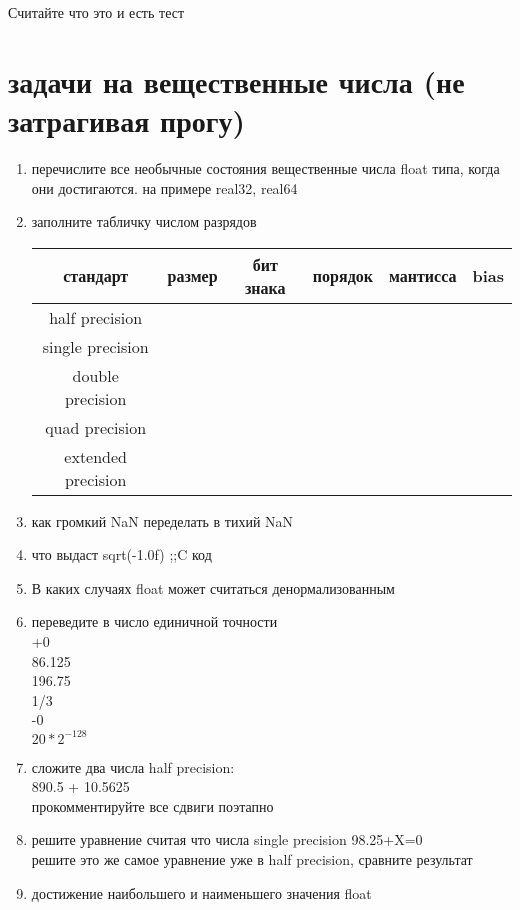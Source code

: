 \documentclass[a4paper,10pt]{article}
\begin{document}
Считайте что это и есть тест

\section*{задачи на вещественные числа (не затрагивая прогу)}
\begin{enumerate}
    \item перечислите все необычные состояния вещественные числа float типа, когда они достигаются. на примере real32, real64
    \item заполните табличку числом разрядов \\
    \begin{tabular}{|c|c|c|c|c|c|}
        \hline
        стандарт& размер & бит знака & порядок & мантисса & bias \\
        \hline
        half precision & & & & \\
        \hline
        single precision & & & & \\
        \hline
        double precision & & & & \\
        \hline
        quad precision & & & & \\
        \hline
        extended precision & & & & \\
        \hline
    \end{tabular}
    \item как громкий NaN переделать в тихий NaN
    \item что выдаст sqrt(-1.0f) ;;C код
    \item В каких случаях float может считаться денормализованным
    \item переведите в число единичной точности\\
    +0 \\ 
    86.125 \\
    196.75 \\
    1/3 \\
    -0 \\
    $20*2^{-128}$ \\
    \item сложите два числа half precision: \\
    890.5 + 10.5625\\
    прокомментируйте все сдвиги поэтапно \\
    \item решите уравнение считая что числа single precision
    98.25+X=0\\
    решите это же самое уравнение уже в half precision, сравните результат \\
    \item достижение наибольшего и наименьшего значения float \\
\end{enumerate}
\end{document}
